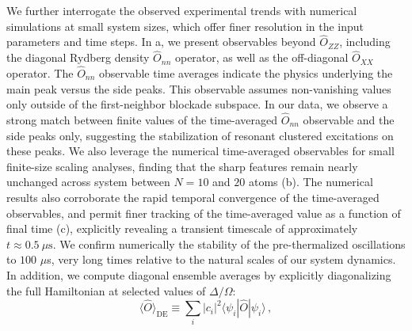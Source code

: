 \documentclass[english,floatfix,twocolumn,showpacs, aps, prx, reprint, superscriptaddress, longbibliography]{revtex4-2}
\begin{document}
We further interrogate the observed experimental trends with numerical simulations at small system sizes, which offer finer resolution in the input parameters and time steps. In a, we present observables beyond $\hat{O}_{ZZ}$, including the diagonal Rydberg density $\hat{O}_{nn}$ operator, as well as the off-diagonal $\hat{O}_{XX}$ operator. The $\hat{O}_{nn}$ observable time averages indicate the physics underlying the main peak versus the side peaks. This observable assumes non-vanishing values only outside of the first-neighbor blockade subspace. In our data, we observe a strong match between finite values of the time-averaged $\hat{O}_{nn}$ observable and the side peaks only, suggesting the stabilization of resonant clustered excitations on these peaks. We also leverage the numerical time-averaged observables for small finite-size scaling analyses, finding that the sharp features remain nearly unchanged across system between $N=10$ and $20$ atoms (b). 
The numerical results also corroborate the rapid temporal convergence of the time-averaged observables, and permit finer tracking of the time-averaged value as a function of final time (c), explicitly revealing a transient timescale of approximately $t \approx 0.5~\mu\mathrm{s}$. We confirm numerically the stability of the pre-thermalized oscillations to $100$ $\mu$s, very long times relative to the natural scales of our system dynamics. In addition, we compute diagonal ensemble averages by explicitly diagonalizing the full Hamiltonian at selected values of $\Delta / \Omega$:
\begin{equation}
    \langle \hat{O} \rangle_{\mathrm{DE}} \equiv \sum_i |c_i|^2 \langle \psi_i | \hat{O} | \psi_i \rangle \, ,
\end{equation}
\end{document}
